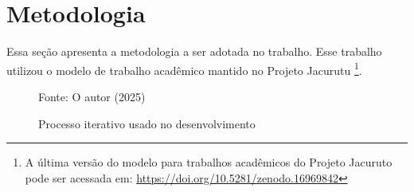 \chapter{Metodologia}\label{cap:metodologia}

Essa seção apresenta a metodologia a ser adotada no trabalho. Esse trabalho utilizou o modelo de trabalho acadêmico mantido no Projeto Jacurutu \cite{Projeto_Jacurutu}\footnote{A última versão do modelo para trabalhos acadêmicos do Projeto Jacuruto pode ser acessada em: \url{https://doi.org/10.5281/zenodo.16969842}}.


\lipsum[37-38]

\begin{figure}[ht]
    \centering
    \caption{Processo iterativo usado no desenvolvimento}
        {Fonte: O autor (2025)}
    \label{fig:metodologia}
\end{figure}

\lipsum[39-41]